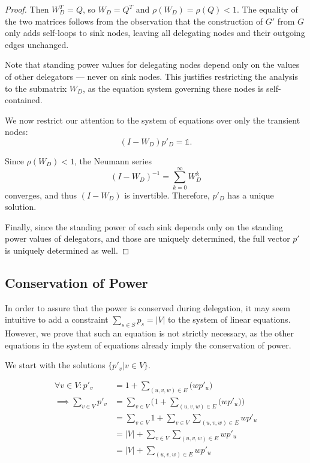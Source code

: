 \begin{proof}
Then $W_D^T = Q$, so $W_D = Q^T$ and $\rho(W_D) = \rho(Q) < 1$. The equality of the two matrices follows from the observation that the construction of $G'$ from $G$ only adds self-loops to sink nodes, leaving all delegating nodes and their outgoing edges unchanged.

Note that standing power values for delegating nodes depend only on the values of other delegators — never on sink nodes. This justifies restricting the analysis to the submatrix $W_D$, as the equation system governing these nodes is self-contained.

We now restrict our attention to the system of equations over only the transient nodes:
\[
(I - W_D) p'_D = \mathbb{1}.
\]

Since $\rho(W_D) < 1$, the Neumann series
\[
(I - W_D)^{-1} = \sum_{k=0}^{\infty} W_D^k
\]
converges, and thus $(I - W_D)$ is invertible. Therefore, $p'_D$ has a unique solution.

Finally, since the standing power of each sink depends only on the standing power values of delegators, and those are uniquely determined, the full vector $p'$ is uniquely determined as well.
\end{proof}

 \subsection{Conservation of Power}
 
 In order to assure that the power is conserved during delegation, it may seem intuitive to add a constraint $\sum_{s \in S} p_s = |V|$ to the system of linear equations. However, we prove that such an equation is not strictly necessary, as the other equations in the system of equations already imply the conservation of power.

We start with the solutions $\{p'_v | v \in V\}$.

\begin{align*}
\forall v \in V: p'_v &= 1+\sum_{(u, v, w) \in E} \bigl(wp'_u \bigr) \\
\implies \sum_{v \in V} p'_v &= \sum_{v \in V} \bigl( 1 + \sum_{(u, v, w) \in E} \bigl( wp'_u \bigr ) \bigr) \\
&= \sum_{v \in V} 1 + \sum_{v \in V} \sum_{(u, v, w) \in E} wp'_u \\
&= |V| + \sum_{v \in V} \sum_{(u, v, w) \in E} wp'_u \\
&= |V| + \sum_{(u, v, w) \in E} wp'_u
\end{align*}

